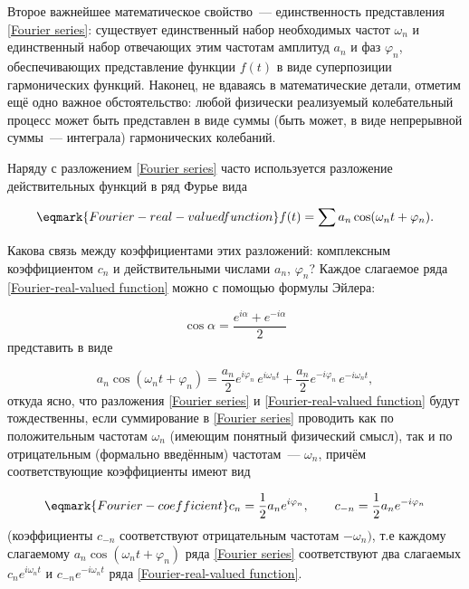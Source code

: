 Второе важнейшее математическое свойство~--- единственность представления
\eqref{Fourier series}: существует единственный набор
необходимых частот $\omega_n$ и единственный набор отвечающих этим частотам
амплитуд $a_n$ и фаз $\varphi_n$, обеспечивающих
представление функции $f(t)$ в виде суперпозиции гармонических функций. Наконец,
не вдаваясь в математические детали,
отметим ещё одно важное обстоятельство: любой физически реализуемый
колебательный процесс может быть представлен в виде
суммы (быть может, в виде непрерывной суммы~--- интеграла) гармонических
колебаний.

Наряду с разложением \eqref{Fourier series} часто используется разложение
действительных функций в ряд Фурье вида

\begin{equation}
    \eqmark{Fourier-real-valued function}
    f(t)=\sum a_n \cos(\omega_n t+\varphi_n ).
\end{equation}

Какова связь между коэффициентами этих разложений: комплексным коэффициентом
$c_n$ и действительными числами $a_n$,
$\varphi_n$? Каждое слагаемое ряда \eqref{Fourier-real-valued function} можно с
помощью формулы Эйлера:

\begin{equation*}
    \cos\alpha=\frac{e^{i\alpha}+e^{-i\alpha}}{2}
\end{equation*}
представить в виде

\begin{equation*}
    a_n\cos(\omega_nt+\varphi_n)=\frac{a_n}{2}e^{i\varphi_n}\,e^{i\omega_n
t}+\frac{a_n}{2}e^{-i\varphi_n}\,e^{-i\omega_n t},
\end{equation*}
откуда ясно, что разложения \eqref{Fourier series} и \eqref{Fourier-real-valued
function} будут тождественны, если суммирование в \eqref{Fourier series}
проводить как по
положительным частотам $\omega_n$ (имеющим понятный физический смысл), так и по
отрицательным (формально введённым)
частотам~--- $\omega_n$, причём соответствующие коэффициенты имеют вид

\begin{equation}
    \eqmark{Fourier-coefficient}
    c_n =\frac{1}{2}a_n e^{i\varphi_n}, \qquad c_{-n}=\frac{1}{2}a_n
e^{-i\varphi_n}
\end{equation}
(коэффициенты $c_{-n}$ соответствуют отрицательным частотам $-\omega_n)$, т.е
каждому слагаемому $a_n\cos(\omega_nt+\varphi_n)$
ряда \eqref{Fourier series} соответствуют два слагаемых $c_ne^{i\omega_n t}$ и
$c_{-n}e^{-i\omega_n t}$ ряда \eqref{Fourier-real-valued function}.

